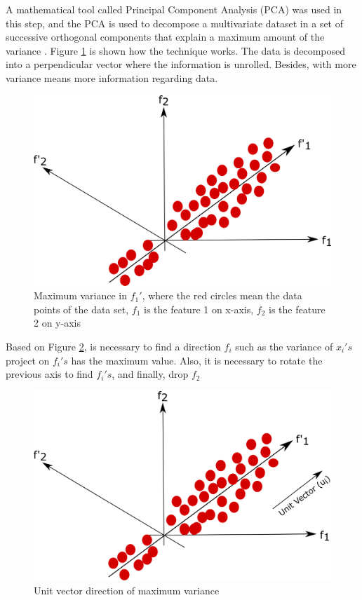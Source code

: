 A mathematical tool called Principal Component Analysis (PCA) was used in this step, and the PCA is used to decompose a multivariate dataset in a set of successive orthogonal components that explain a maximum amount of the variance \cite{pedregosa2011scikit}. Figure \ref{fig:pca_step1} is shown how the technique works. The data is decomposed into a perpendicular vector where the information is unrolled. Besides, with more variance means more information regarding data.

\begin{figure}[H]
\centering
\includegraphics[scale=0.7]{imagens/pca1.png}
\caption{Maximum variance in $f_1'$, where the red circles mean the data points of the data set, $f_1$ is the feature 1 on x-axis, $f_2$ is the feature 2 on y-axis}
\label{fig:pca_step1}
\end{figure}


Based on Figure \ref{fig:pca_step2}, is necessary to find a direction $f_i$ such as the variance of $x_i's$ project on $f_i's$ has the maximum value. Also, it is necessary to rotate the previous axis to find $f_i' s$, and finally, drop $f_2$

\begin{figure}[H]
\centering
\includegraphics[scale=0.7]{imagens/pca2.png}
\caption{Unit vector direction of maximum variance}
\label{fig:pca_step2}
\end{figure}

